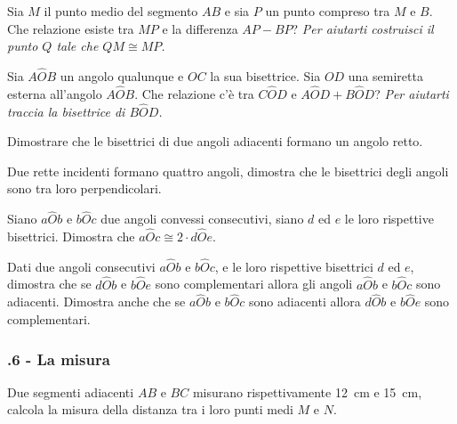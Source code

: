\begin{multicols}{2}
\begin{esercizio}
\label{ese:1.98}
Sia $M$ il punto medio del segmento $AB$ e sia $P$ un punto compreso tra $M$ e $B$. Che relazione esiste tra $MP$ e la differenza $AP-BP$? \emph{Per aiutarti costruisci il punto $Q$ tale che $QM\cong MP$.}
\end{esercizio}

\begin{esercizio}
\label{ese:1.99}
Sia $A\widehat{O}B$ un angolo qualunque e $OC$ la sua bisettrice. Sia $OD$ una semiretta esterna all'angolo $A\widehat{O}B$. Che relazione c'è tra $C\widehat{O}D$ e $A\widehat{O}D+B\widehat{O}D$? \emph{Per aiutarti traccia la bisettrice di $B\widehat{O}D$.}
\end{esercizio}

\begin{esercizio}
\label{ese:1.100}
Dimostrare che le bisettrici di due angoli adiacenti formano un angolo retto.
\end{esercizio}

\begin{esercizio}
\label{ese:1.101}
Due rette incidenti formano quattro angoli, dimostra che le bisettrici degli angoli sono tra loro perpendicolari.
\end{esercizio}

\begin{esercizio}
\label{ese:1.102}
Siano $a\widehat{O}b$ e $b\widehat{O}c$ due angoli convessi consecutivi, siano $d$ ed $e$ le loro rispettive bisettrici. Dimostra che $a\widehat{O}c\cong 2\cdot d\widehat{O}e$.
\end{esercizio}

\begin{esercizio}
\label{ese:1.103}
Dati due angoli consecutivi $a\widehat{O}b$ e $b\widehat{O}c$, e le loro rispettive bisettrici $d$ ed $e$, dimostra che se $d\widehat{O}b$ e $b\widehat{O}e$ sono complementari allora gli angoli $a\widehat{O}b$ e $b\widehat{O}c$ sono adiacenti. Dimostra anche che se $a\widehat{O}b$ e $b\widehat{O}c$ sono adiacenti allora  $d\widehat{O}b$ e $b\widehat{O}e$ sono complementari.
\end{esercizio}

\subsubsection*{\thechapter.6 - La misura}
 
\begin{esercizio}
\label{ese:1.104}
Due segmenti adiacenti $AB$ e $BC$ misurano rispettivamente 12~cm e 15~cm, calcola la misura della distanza tra i loro punti medi $M$ e $N$.
\end{esercizio}


\end{multicols}
